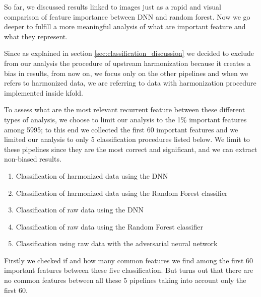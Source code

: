 \documentclass[11pt]{report}
\begin{document}
So far, we discussed results linked to images just as a rapid and visual comparison of feature importance between DNN and random forest.
Now we go deeper to fulfill a more meaningful analysis of what are important feature and what they represent.

Since as explained in section \ref{sec:classification_discussion} we decided to exclude from our analysis the procedure of upstream harmonization because it creates a bias in results, from now on, we focus only on the other pipelines and when we refers to harmonized data, we are referring to data with harmonization procedure implemented inside kfold.

To assess what are the most relevant recurrent feature between these different types of analysis, we choose to limit our analysis to the 1\% important features among 5995; to this end we collected the first 60 important features and we limited our analysis to only 5 classification procedures listed below.
We limit to these pipelines since they are the most correct and significant, and we can extract non-biased results.


\begin{enumerate}
\item Classification of harmonized data using the DNN \label{proc:dnn_kfold}
\item Classification of harmonized data using the Random Forest classifier \label{proc:rf_kfold}
\item Classification of raw data using the DNN \label{proc:dnn_no}
\item Classification of raw data using the Random Forest classifier \label{proc:rf_no}
\item Classification using raw data with the adversarial neural network \label{proc:adv}
\end{enumerate}



Firstly we checked if and how many common features we find among the first 60 important features between these five classification.
But turns out that there are no common features between all these 5 pipelines taking into account only the first 60.
\end{document}
